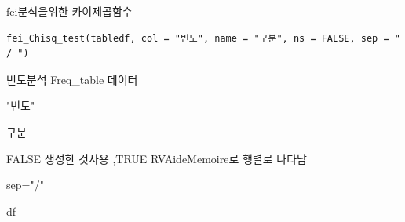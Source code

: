 \documentclass[a4paper]{book}
\begin{document}
%
\begin{Description}
fei분석을위한 카이제곱함수
\end{Description}
%
\begin{Usage}
\begin{verbatim}
fei_Chisq_test(tabledf, col = "빈도", name = "구분", ns = FALSE, sep = " / ")
\end{verbatim}
\end{Usage}
%
\begin{Arguments}
\begin{ldescription}
\item[\code{tabledf}] 빈도분석 Freq\_table 데이터

\item[\code{col}] "빈도"

\item[\code{name}] 구분

\item[\code{ns}] FALSE 생성한 것사용 ,TRUE RVAideMemoire로 행렬로 나타남

\item[\code{sep}] sep="/"
\end{ldescription}
\end{Arguments}
%
\begin{Value}
df
\end{Value}
%
\begin{Examples}
\end{Examples}
\end{document}
